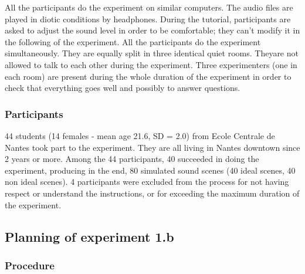 \documentclass[twoside,twocolumn]{article}
\begin{document}
All the participants do the experiment on similar computers. The audio files are played in diotic conditions by headphones. During the tutorial, participants are asked to adjust the sound level in order to be comfortable; they can’t modify it in the following of the experiment.
All the participants do the experiment simultaneously. They are equally split in three identical quiet rooms. Theyare not allowed to talk to each other during the experiment.
Three experimenters (one in each room) are present during the whole duration of the experiment in order to check that everything goes well and possibly to answer questions.

\subsubsection*{Participants}

%

44 students (14 females - mean age 21.6, SD = 2.0) from Ecole Centrale de Nantes took part to the experiment. They are all living in Nantes downtown since 2 years or more.
Among the 44 participants, 40 succeeded in doing the experiment, producing in the end, 80 simulated sound scenes (40 ideal scenes, 40 non ideal scenes). 4 participants were excluded from the process for not having respect or understand the instructions, or for exceeding the maximum duration of the experiment.

\subsection{Planning of experiment 1.b}
\label{sec:xp1b_plan}

\subsubsection*{Procedure}
\end{document}
